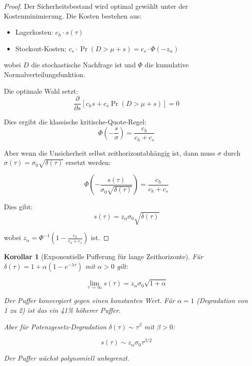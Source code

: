 \documentclass[a4paper, 12pt, twoside, openright]{report}
\newtheorem{corollary}[theorem]{Korollar}
\theoremstyle{definition}
\theoremstyle{definition}
\begin{document}
\begin{proof}
Der Sicherheitsbestand wird optimal gewählt unter der Kostenminimierung. Die Kosten bestehen aus:
\begin{itemize}
  \item Lagerkosten: $c_h \cdot s(\tau)$
  \item Stockout-Kosten: $c_s \cdot \Pr(D > \mu + s) = c_s \cdot \Phi(-z_\alpha)$
\end{itemize}

wobei $D$ die stochastische Nachfrage ist und $\Phi$ die kumulative Normalverteilungsfunktion.

Die optimale Wahl setzt:
\begin{equation}
\frac{\partial}{\partial s} \left[ c_h s + c_s \Pr(D > \mu + s) \right] = 0
\end{equation}

Dies ergibt die klassische kritische-Quote-Regel:
\begin{equation}
\Phi\left(-\frac{s}{\sigma}\right) = \frac{c_h}{c_h + c_s}
\end{equation}

Aber wenn die Unsicherheit selbst zeithorizontabhängig ist, dann muss $\sigma$ durch $\sigma(\tau) = \sigma_0 \sqrt{\delta(\tau)}$ ersetzt werden:

\begin{equation}
\Phi\left(-\frac{s(\tau)}{\sigma_0\sqrt{\delta(\tau)}}\right) = \frac{c_h}{c_h + c_s}
\end{equation}

Dies gibt:
\begin{equation}
s(\tau) = z_\alpha \sigma_0 \sqrt{\delta(\tau)}
\end{equation}

wobei $z_\alpha = \Phi^{-1}(1 - \frac{c_h}{c_h + c_s})$ ist.
\end{proof}

\begin{corollary}[Exponentielle Pufferung für lange Zeithorizonte]
Für $\delta(\tau) = 1 + \alpha(1 - e^{-\lambda\tau})$ mit $\alpha > 0$ gilt:

\begin{equation}
\lim_{\tau \to \infty} s(\tau) = z_\alpha \sigma_0 \sqrt{1 + \alpha}
\end{equation}

Der Puffer konvergiert gegen einen konstanten Wert. Für $\alpha = 1$ (Degradation von 1 zu 2) ist das ein 41\% höherer Puffer.

Aber für Potenzgesetz-Degradation $\delta(\tau) \sim \tau^\beta$ mit $\beta > 0$:

\begin{equation}
s(\tau) \sim z_\alpha \sigma_0 \tau^{\beta/2}
\end{equation}

Der Puffer wächst polynomiell unbegrenzt.
\end{corollary}
\end{document}

